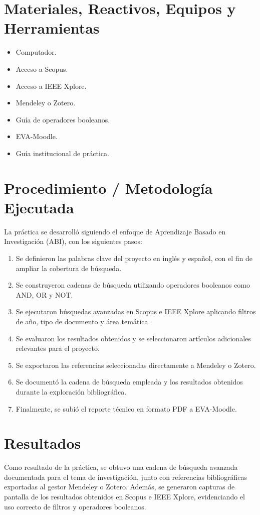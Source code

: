 \documentclass[11pt,a4paper]{article}
\begin{document}
\section{Materiales, Reactivos, Equipos y Herramientas}
\begin{itemize}[leftmargin=1.2cm]
    \item Computador.
    \item Acceso a Scopus.
    \item Acceso a IEEE Xplore.
    \item Mendeley o Zotero.
    \item Guía de operadores booleanos.
    \item EVA-Moodle.
    \item Guía institucional de práctica.
\end{itemize}

\section{Procedimiento / Metodología Ejecutada}
La práctica se desarrolló siguiendo el enfoque de Aprendizaje Basado en Investigación (ABI), con los siguientes pasos:

\begin{enumerate}[leftmargin=1.2cm]
    \item Se definieron las palabras clave del proyecto en inglés y español, con el fin de ampliar la cobertura de búsqueda.
    \item Se construyeron cadenas de búsqueda utilizando operadores booleanos como AND, OR y NOT.
    \item Se ejecutaron búsquedas avanzadas en Scopus e IEEE Xplore aplicando filtros de año, tipo de documento y área temática.
    \item Se evaluaron los resultados obtenidos y se seleccionaron artículos adicionales relevantes para el proyecto.
    \item Se exportaron las referencias seleccionadas directamente a Mendeley o Zotero.
    \item Se documentó la cadena de búsqueda empleada y los resultados obtenidos durante la exploración bibliográfica.
    \item Finalmente, se subió el reporte técnico en formato PDF a EVA-Moodle.
\end{enumerate}

\section{Resultados}
Como resultado de la práctica, se obtuvo una cadena de búsqueda avanzada documentada para el tema de investigación, junto con referencias bibliográficas exportadas al gestor Mendeley o Zotero. Además, se generaron capturas de pantalla de los resultados obtenidos en Scopus e IEEE Xplore, evidenciando el uso correcto de filtros y operadores booleanos.
\end{document}

